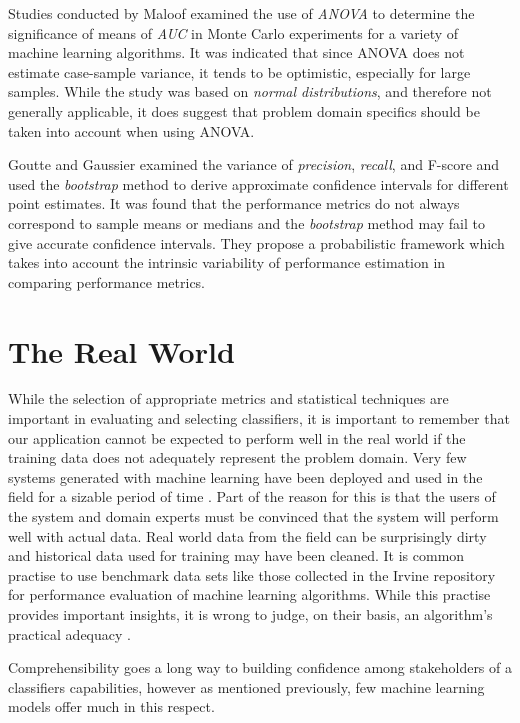 \documentclass[10pt]{unbthesis}
\begin{document}
Studies conducted by Maloof \cite{RefWorks:38} examined
the use of \textit{ANOVA} to determine the
significance of means of \textit{AUC} in Monte Carlo experiments for a
variety of machine learning algorithms. It was indicated that since ANOVA does not
estimate case-sample variance, it tends to be 
optimistic, especially for large samples. While the study was based on
\textit{normal distributions}, and therefore not generally applicable,
it does suggest that problem domain specifics should be taken into
account when using ANOVA.

Goutte and Gaussier \cite{RefWorks:40} examined the variance of
\textit{precision}, \textit{recall}, and {F-score} and used the
\textit{bootstrap} method to derive approximate confidence intervals
for different point estimates. It was found that the performance
metrics do not always correspond to sample means or medians and the
\textit{bootstrap} method may fail to give accurate confidence
intervals. They propose a probabilistic framework which takes into
account the intrinsic variability of performance estimation in
comparing performance metrics.


\section{The Real World}
While the selection of appropriate metrics and statistical techniques
are important in evaluating and selecting classifiers, it is important
to remember that our application cannot be expected to perform well in
the real world if the training data does not adequately represent the
problem domain. Very few systems generated with machine learning have
been deployed and used in the field for a sizable period of time
\cite{RefWorks:46}. Part of the reason for this is that the users of
the system and domain experts must be convinced that the system will
perform well with actual data. Real world data from the field can be
surprisingly dirty \cite{RefWorks:58} and historical data used for
training may have been cleaned. It is common practise to use benchmark
data sets like those collected in the Irvine repository
\cite{RefWorks:59} for performance evaluation of machine learning
algorithms. While this practise provides important insights, it is
wrong to judge, on their basis, an algorithm's practical adequacy
\cite{RefWorks:46}.

Comprehensibility goes a long way to building confidence among
stakeholders of a classifiers capabilities, however as mentioned
previously, few machine learning models offer much in this respect.
\end{document}
